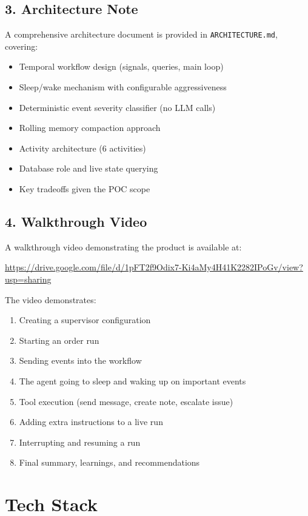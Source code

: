 \documentclass[11pt,a4paper]{article}
\begin{document}
\subsection*{3. Architecture Note}
A comprehensive architecture document is provided in \texttt{ARCHITECTURE.md}, covering:
\begin{itemize}[nosep]
    \item Temporal workflow design (signals, queries, main loop)
    \item Sleep/wake mechanism with configurable aggressiveness
    \item Deterministic event severity classifier (no LLM calls)
    \item Rolling memory compaction approach
    \item Activity architecture (6 activities)
    \item Database role and live state querying
    \item Key tradeoffs given the POC scope
\end{itemize}

\subsection*{4. Walkthrough Video}
A walkthrough video demonstrating the product is available at:

\vspace{0.5em}
\noindent\url{https://drive.google.com/file/d/1pFT2f9Odix7-Ki4aMy4H41K2282IPoGv/view?usp=sharing}

\vspace{0.5em}
\noindent The video demonstrates:
\begin{enumerate}[nosep]
    \item Creating a supervisor configuration
    \item Starting an order run
    \item Sending events into the workflow
    \item The agent going to sleep and waking up on important events
    \item Tool execution (send message, create note, escalate issue)
    \item Adding extra instructions to a live run
    \item Interrupting and resuming a run
    \item Final summary, learnings, and recommendations
\end{enumerate}

\section*{Tech Stack}
\end{document}
